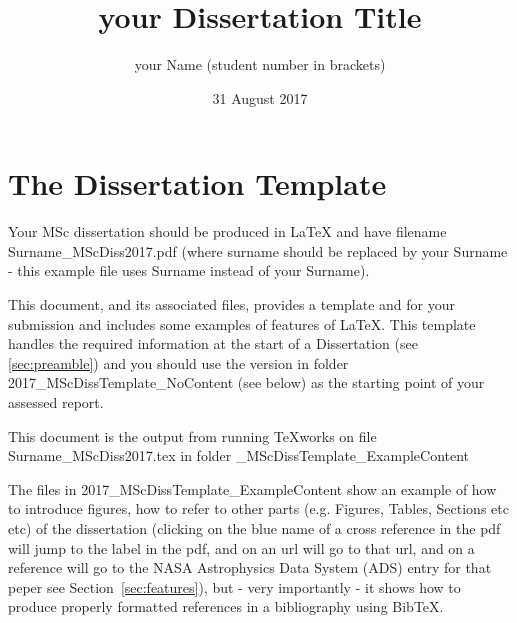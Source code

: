 \documentclass[twoside, fontsize=12pt,
     bibliography=totoc, %
     listof=totoc, %
     index=totoc, %
     onehalfspacing %
]{_MScDiss2017_cls}
\title{your Dissertation Title}
\author{your Name (student number in brackets) }
\date{31 August 2017}
\begin{document}
\setcounter{tocdepth}{5}

\maketitle
{}
\tableofcontents %
\listoffigures %
\listoftables %

\newpage%
\cleardoublepage
{}%


\chapter{The Dissertation Template}
\label{sec:template}
Your MSc dissertation should be produced in LaTeX and have filename \newline Surname\_MScDiss2017.pdf (where surname should be replaced by your Surname - this example file uses Surname instead of your Surname).

This document, and its associated files, provides a template and for your submission and includes some examples of features of \LaTeX. 
This template handles the required information at the start of a Dissertation (see \ref{sec:preamble}) and you should use the  version in folder 2017\_MScDissTemplate\_NoContent (see below) as the starting point of your assessed report. 

This document is the output from running TeXworks on file \newline  Surname\_MScDiss2017.tex \newline in folder \_MScDissTemplate\_ExampleContent

The files in 2017\_MScDissTemplate\_ExampleContent show an example of how to introduce figures, how to refer to other parts (e.g. Figures, Tables, Sections etc etc) of the dissertation (clicking on the blue name of a cross reference in the pdf will jump to the label in the pdf, and on an url will go to that url, and on a reference will go to the NASA Astrophysics Data System (ADS) entry for that peper see 
Section~\ref{sec:features}), but - very importantly - it shows how to produce properly formatted references in a bibliography using BibTeX. 
\end{document}
